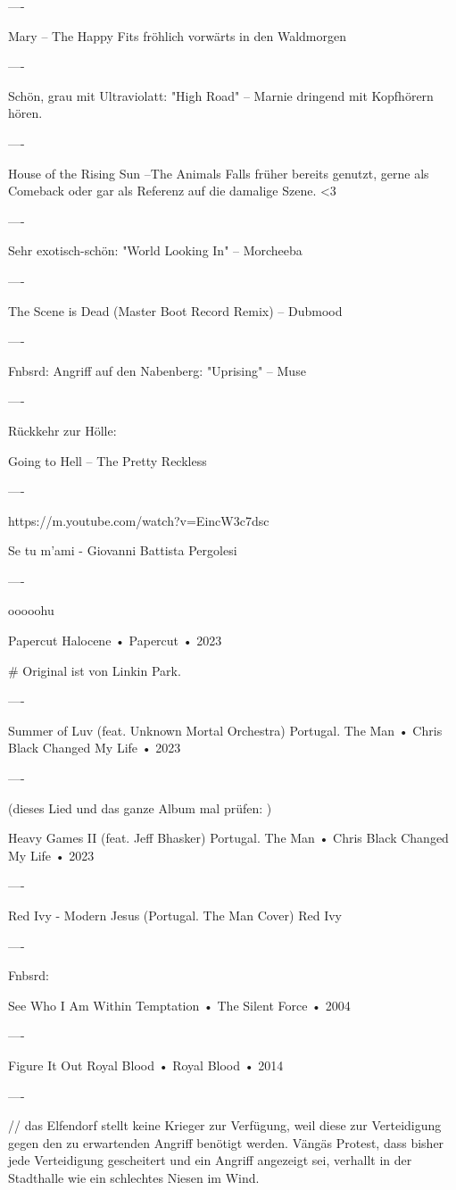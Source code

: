 ----

Mary – The Happy Fits
fröhlich vorwärts in den Waldmorgen

----

Schön, grau mit Ultraviolatt:
"High Road" – Marnie
dringend mit Kopfhörern hören.

----

House of the Rising Sun –The Animals
Falls früher bereits genutzt, gerne als Comeback oder gar als Referenz auf die damalige Szene. <3

----

Sehr exotisch-schön:
"World Looking In" – Morcheeba

----

The Scene is Dead (Master Boot Record Remix) – Dubmood

----

Fnbsrd: Angriff auf den Nabenberg: "Uprising" – Muse

----

Rückkehr zur Hölle:

Going to Hell
– The Pretty Reckless

----

https://m.youtube.com/watch?v=EincW3c7dsc

Se tu m'ami - Giovanni Battista Pergolesi

----

ooooohu

Papercut
Halocene
 •
Papercut
 •
2023

#
Original ist von Linkin Park.

----

Summer of Luv (feat. Unknown Mortal Orchestra)
Portugal. The Man
 •
Chris Black Changed My Life
 •
2023

----

(dieses Lied und das ganze Album mal prüfen: )

Heavy Games II (feat. Jeff Bhasker)
Portugal. The Man
 •
Chris Black Changed My Life
 •
2023

----

Red Ivy - Modern Jesus (Portugal. The Man Cover)
Red Ivy

----

Fnbsrd:

See Who I Am
Within Temptation
 •
The Silent Force
 •
2004

----

Figure It Out
Royal Blood
 •
Royal Blood
 •
2014

----

// das Elfendorf stellt keine Krieger zur Verfügung, weil diese zur Verteidigung gegen den zu erwartenden Angriff benötigt werden. Vängäs Protest, dass bisher jede Verteidigung gescheitert und ein Angriff angezeigt sei, verhallt in der Stadthalle wie ein schlechtes Niesen im Wind.

